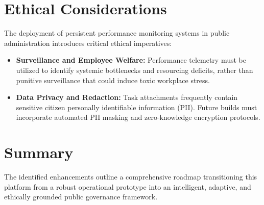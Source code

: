 \section{Ethical Considerations}
\label{sec:ethical_considerations}
The deployment of persistent performance monitoring systems in public administration introduces critical ethical imperatives:
\begin{itemize}
    \item \textbf{Surveillance and Employee Welfare:} Performance telemetry must be utilized to identify systemic bottlenecks and resourcing deficits, rather than punitive surveillance that could induce toxic workplace stress.
    \item \textbf{Data Privacy and Redaction:} Task attachments frequently contain sensitive citizen personally identifiable information (PII). Future builds must incorporate automated PII masking and zero-knowledge encryption protocols.
\end{itemize}

\section{Summary}
\label{sec:fw_summary}
The identified enhancements outline a comprehensive roadmap transitioning this platform from a robust operational prototype into an intelligent, adaptive, and ethically grounded public governance framework.
